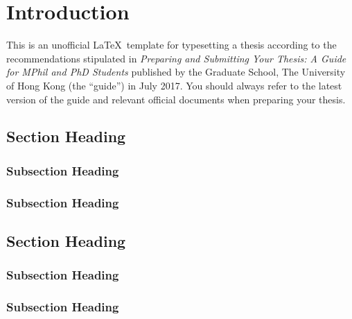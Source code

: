 
\chapter{Introduction}

This is an unofficial \LaTeX\ template \cite{GitHub} for typesetting a thesis according to the recommendations stipulated in \emph{Preparing and Submitting Your Thesis: A Guide for MPhil and PhD Students} \cite{Guide2017} published by the Graduate School, The University of Hong Kong (the ``guide'') in July 2017. You should always refer to the latest version of the guide and relevant official documents \cite{GSInfo} when preparing your thesis.

\section{Section Heading}

\lipsum[1]

\subsection{Subsection Heading}

\lipsum[2]

\subsection{Subsection Heading}

\lipsum[3]

\section{Section Heading}

\lipsum[4]

\subsection{Subsection Heading}

\lipsum[5]

\subsection{Subsection Heading}

\lipsum[6]
